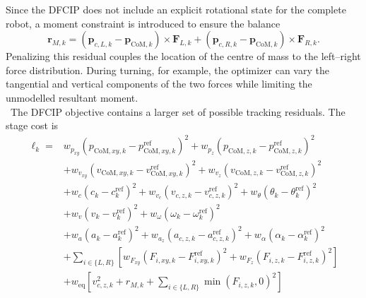 %
Since the DFCIP does not include an explicit rotational state for the complete
robot, a moment constraint is introduced to ensure the balance
%
\begin{equation}
    \mathbf{r}_{M,k}
    =
    \left(
        \mathbf{p}_{c,L,k}
        -
        \mathbf{p}_{\mathrm{CoM},k}
    \right)
    \times
    \mathbf{F}_{L,k}
    +
    \left(
        \mathbf{p}_{c,R,k}
        -
        \mathbf{p}_{\mathrm{CoM},k}
    \right)
    \times
    \mathbf{F}_{R,k}.
    \label{eq:dfcip_moment_residual}
\end{equation}
%
Penalizing this residual couples the location of the centre of mass to the
left--right force distribution. During turning, for example, the optimizer can
vary the tangential and vertical components of the two forces while limiting
the unmodelled resultant moment.\\
\
The DFCIP objective contains a larger set of possible tracking residuals. The stage cost is
%
\begin{equation}
\begin{aligned}
    \ell_k = 
        &w_{p_{xy}}
        \left(
            p_{\mathrm{CoM},xy,k}
            -p_{\mathrm{CoM},xy,k}^{\mathrm{ref}}
        \right)^2
        +w_{p_z}
        \left(
            p_{\mathrm{CoM},z,k}
            -p_{\mathrm{CoM},z,k}^{\mathrm{ref}}
        \right)^2
        \\
        &+w_{v_{xy}}
        \left(
            v_{\mathrm{CoM},xy,k}
            -v_{\mathrm{CoM},xy,k}^{\mathrm{ref}}
        \right)^2
        +w_{v_z}
        \left(
            v_{\mathrm{CoM},z,k}
            -v_{\mathrm{CoM},z,k}^{\mathrm{ref}}
        \right)^2
        \\
        &+w_c\left(c_k-c_k^{\mathrm{ref}}\right)^2
        +w_{v_c}
        \left(v_{c,z,k}-v_{c,z,k}^{\mathrm{ref}}\right)^2
        +w_{\theta}
        \left(\theta_k-\theta_k^{\mathrm{ref}}\right)^2
        \\
        &+w_v\left(v_k-v_k^{\mathrm{ref}}\right)^2
        +w_{\omega}\left(\omega_k-\omega_k^{\mathrm{ref}}\right)^2
        \\
        &+w_a\left(a_k-a_k^{\mathrm{ref}}\right)^2
        +w_{a_z}
        \left(a_{c,z,k}-a_{c,z,k}^{\mathrm{ref}}\right)^2
        +w_{\alpha}
        \left(\alpha_k-\alpha_k^{\mathrm{ref}}\right)^2
        \\
        &+\sum_{i\in\{L,R\}}
        \left[
            w_{F_{xy}}
            \left(F_{i,xy,k}-F_{i,xy,k}^{\mathrm{ref}}\right)^2
            +w_{F_z}
            \left(F_{i,z,k}-F_{i,z,k}^{\mathrm{ref}}\right)^2
        \right]
        \\
        &+w_{\mathrm{eq}}
        \left[
            v_{c,z,k}^{2}
            +r_{M,k}
            +\sum_{i\in\{L,R\}}
             \min\left(F_{i,z,k},0\right)^2
        \right]
\end{aligned}
\label{eq:dfcip_stage_cost}
\end{equation}
